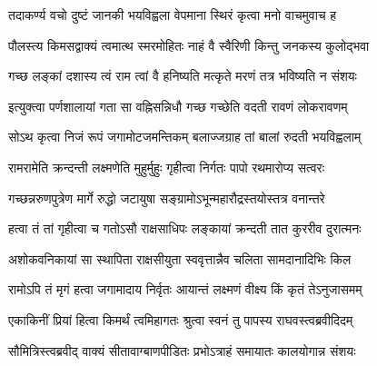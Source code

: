 

\storymeta



\twolineshloka
{तदाकर्ण्य वचो दुष्टं जानकी भयविह्वला}
{वेपमाना स्थिरं कृत्वा मनो वाचमुवाच ह}%

\twolineshloka
{पौलस्त्य किमसद्वाक्यं त्वमात्थ स्मरमोहितः}
{नाहं वै स्वैरिणी किन्तु जनकस्य कुलोद्‌भवा}%

\twolineshloka
{गच्छ लङ्कां दशास्य त्वं राम त्वां वै हनिष्यति}
{मत्कृते मरणं तत्र भविष्यति न संशयः}%

\twolineshloka
{इत्युक्त्वा पर्णशालायां गता सा वह्निसन्निधौ}
{गच्छ गच्छेति वदती रावणं लोकरावणम्}%

\twolineshloka
{सोऽथ कृत्वा निजं रूपं जगामोटजमन्तिकम्}
{बलाज्जग्राह तां बालां रुदती भयविह्वलाम्}%

\twolineshloka
{रामरामेति क्रन्दन्ती लक्ष्मणेति मुहुर्मुहुः}
{गृहीत्वा निर्गतः पापो रथमारोप्य सत्वरः}%

\twolineshloka
{गच्छन्नरुणपुत्रेण मार्गे रुद्धो जटायुषा}
{सङ्ग्रामोऽभून्महारौद्रस्तयोस्तत्र वनान्तरे}%

\twolineshloka
{हत्वा तं तां गृहीत्वा च गतोऽसौ राक्षसाधिपः}
{लङ्कायां क्रन्दती तात कुररीव दुरात्मनः}%

\twolineshloka
{अशोकवनिकायां सा स्थापिता राक्षसीयुता}
{स्ववृत्तान्नैव चलिता सामदानादिभिः किल}%

\twolineshloka
{रामोऽपि तं मृगं हत्वा जगामादाय निर्वृतः}
{आयान्तं लक्ष्मणं वीक्ष्य किं कृतं तेऽनुजासमम्}%

\twolineshloka
{एकाकिनीं प्रियां हित्वा किमर्थं त्वमिहागतः}
{श्रुत्वा स्वनं तु पापस्य राघवस्त्वब्रवीदिदम्}%

\twolineshloka
{सौ‌मित्रिस्त्वब्रवीद् वाक्यं सीतावाग्बाणपीडितः}
{प्रभोऽत्राहं समायातः कालयोगान्न संशयः}%

